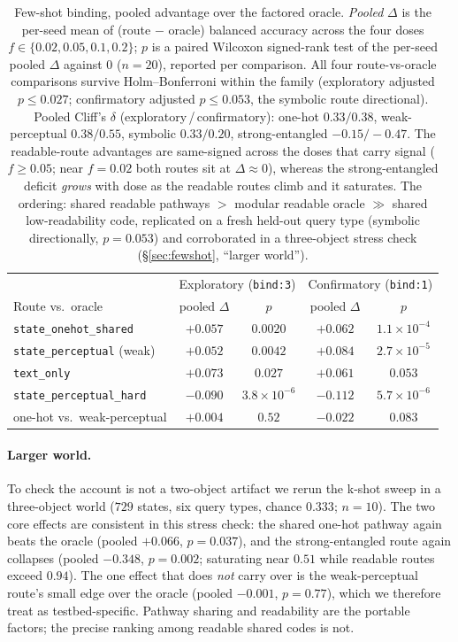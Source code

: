 \documentclass[10pt]{article} %
\begin{document}
\begin{table}[h]
\centering\small
\begin{tabular}{lcc|cc}
\toprule
& \multicolumn{2}{c|}{Exploratory (\texttt{bind:3})} & \multicolumn{2}{c}{Confirmatory (\texttt{bind:1})}\\
Route vs.\ oracle & pooled $\Delta$ & $p$ & pooled $\Delta$ & $p$\\
\midrule
\texttt{state\_onehot\_shared} & $+0.057$ & $0.0020$ & $+0.062$ & $1.1\times10^{-4}$\\
\texttt{state\_perceptual} (weak) & $+0.052$ & $0.0042$ & $+0.084$ & $2.7\times10^{-5}$\\
\texttt{text\_only} & $+0.073$ & $0.027$ & $+0.061$ & $0.053$\\
\texttt{state\_perceptual\_hard} & $-0.090$ & $3.8\times10^{-6}$ & $-0.112$ & $5.7\times10^{-6}$\\
\midrule
one-hot vs.\ weak-perceptual & $+0.004$ & $0.52$ & $-0.022$ & $0.083$\\
\bottomrule
\end{tabular}
\caption{Few-shot binding, pooled advantage over the factored oracle. \emph{Pooled} $\Delta$ is the
per-seed mean of (route $-$ oracle) balanced accuracy across the four doses
$f\in\{0.02,0.05,0.1,0.2\}$; $p$ is a paired Wilcoxon signed-rank test of the per-seed pooled
$\Delta$ against $0$ ($n{=}20$), reported per comparison. All four route-vs-oracle comparisons
survive Holm--Bonferroni within the family (exploratory adjusted $p\le0.027$; confirmatory adjusted
$p\le0.053$, the symbolic route directional). Pooled Cliff's $\delta$ (exploratory\,/\,confirmatory):
one-hot $0.33/0.38$, weak-perceptual $0.38/0.55$, symbolic $0.33/0.20$, strong-entangled
$-0.15/-0.47$. The readable-route advantages are same-signed across the doses that carry signal
($f\ge0.05$; near $f{=}0.02$ both routes sit at $\Delta\approx0$), whereas the strong-entangled
deficit \emph{grows} with dose as the readable routes climb and it saturates. The ordering: shared
readable pathways $>$ modular readable oracle $\gg$ shared low-readability code, replicated on a
fresh held-out query type (symbolic directionally, $p=0.053$) and corroborated in a three-object
stress check (\S\ref{sec:fewshot}, ``larger world'').}
\label{tab:fewshot}
\end{table}

\paragraph{Larger world.} To check the account is not a two-object artifact we rerun the k-shot
sweep in a three-object world ($729$ states, six query types, chance $0.333$; $n{=}10$). The two
core effects are consistent in this stress check: the shared one-hot pathway again beats the oracle (pooled $+0.066$,
$p = 0.037$), and the strong-entangled route again collapses (pooled $-0.348$, $p = 0.002$;
saturating near $0.51$ while readable routes exceed $0.94$). The one effect that does \emph{not}
carry over is the weak-perceptual route's small edge over the oracle (pooled $-0.001$, $p = 0.77$),
which we therefore treat as testbed-specific. Pathway sharing and readability are the portable
factors; the precise ranking among readable shared codes is not.
\end{document}

